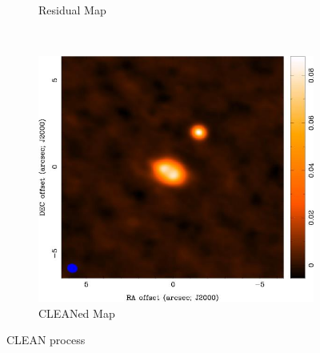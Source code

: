 \begin{figure}
\begin{subfigure}[b]{0.5\textwidth}
                \caption{Residual Map}
                \label{fig:ResMap583}
        \end{subfigure} %
        ~ %
        \begin{subfigure}[b]{0.5\textwidth}
        \centering
                \includegraphics[scale=0.7]{Figures/uv-coverage/cleanRes}
                \caption{CLEANed Map}
                \label{fig:Restmap}
        \end{subfigure}%
        \caption[CLEAN process]{ CLEAN process ~\citep[Slide 54,56,58,59]{wilner.siw2014}}\label{fig:CLEANed}
\end{figure}
\newpage
